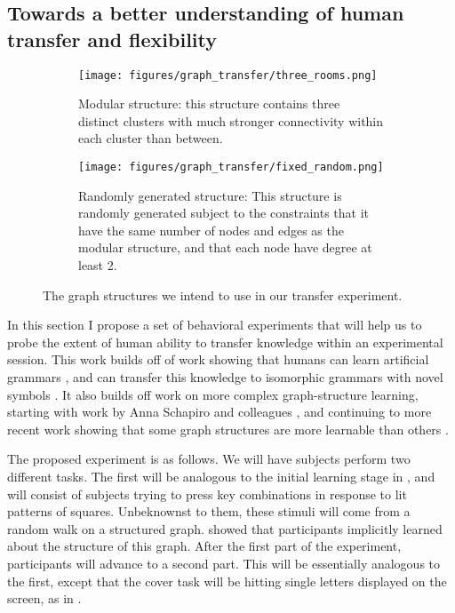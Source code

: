 \documentclass[11pt]{article}
\begin{document}
\subsection{Towards a better understanding of human transfer and flexibility}
\begin{figure}
\centering
\begin{subfigure}[t]{0.5\textwidth}
\texttt{[image: figures/graph\_transfer/three\_rooms.png]}
\captionsetup{width=.9\linewidth}
\caption{Modular structure: this structure contains three distinct clusters with much stronger connectivity within each cluster than between.}
\end{subfigure}%
\begin{subfigure}[t]{0.5\textwidth}
\texttt{[image: figures/graph\_transfer/fixed\_random.png]}
\captionsetup{width=.9\linewidth}
\caption{Randomly generated structure: This structure is randomly generated subject to the constraints that it have the same number of nodes and edges as the modular structure, and that each node have degree at least 2.}
\end{subfigure}%
\caption{The graph structures we intend to use in our transfer experiment.}
\label{graph_struct_fig}
\end{figure}
In this section I propose a set of behavioral experiments that will help us to probe the extent of human ability to transfer knowledge within an experimental session. This work builds off of work showing that humans can learn artificial grammars \citet{Cleeremans1991}, and can transfer this knowledge to isomorphic grammars with novel symbols \citep{Tunney2001}. It also builds off work on more complex graph-structure learning, starting with work by Anna Schapiro and colleagues \citep{Schapiro2013}, and continuing to more recent work showing that some graph structures are more learnable than others \citep{Kahn2018}. \par
The proposed experiment is as follows. We will have subjects perform two different tasks. The first will be analogous to the initial learning stage in \citet{Kahn2018}, and will consist of subjects trying to press key combinations in response to lit patterns of squares. Unbeknownst to them, these stimuli will come from a random walk on a structured graph. \citet{Kahn2018} showed that participants implicitly learned about the structure of this graph. After the first part of the experiment, participants will advance to a second part. This will be essentially analogous to the first, except that the cover task will be hitting single letters displayed on the screen, as in \citep{Cleeremans1991}. \par
\end{document}

